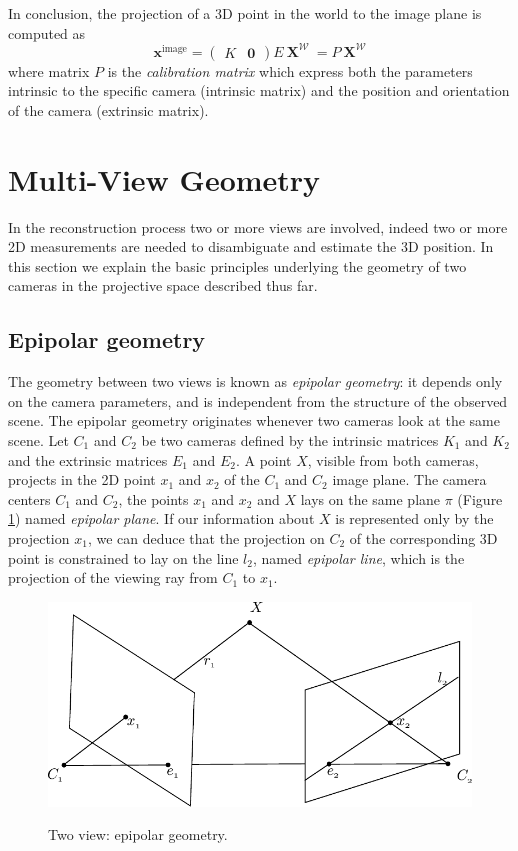 In conclusion, the projection of a 3D point in the world to the image plane is computed as
\begin{equation}
 \mathbf{x}^{\text{image}}
 = 
\begin{pmatrix}
 K &\mathbf{0}
 \end{pmatrix} 
E
\:
 \mathbf{X}^\mathcal{W}\:=
P
\:
 \mathbf{X}^\mathcal{W}
\end{equation}
where matrix $P$ is the \emph{calibration matrix} which express both the parameters intrinsic to the specific camera (intrinsic matrix) and the position and orientation of the camera (extrinsic matrix).


\section{Multi-View Geometry}
In the reconstruction process two or more views are involved, indeed two or more 2D measurements are needed to disambiguate and estimate the 3D position. 
In this section we explain the basic principles underlying the geometry of two cameras in the projective space described thus far.
\subsection{Epipolar geometry}
The geometry between two views is known as \emph{epipolar geometry}: it depends only on the camera parameters, and is independent from the structure of the observed scene.
The epipolar geometry originates whenever two cameras look at the same scene. 
Let $C_1$ and $C_2$ be two cameras defined by the intrinsic matrices $K_1$ and $K_2$ and the extrinsic matrices $E_1$ and $E_2$.
A point $X$,  visible from both cameras, projects in the 2D point $x_1$ and $x_2$ of the $C_1$ and   $C_2$ image plane.
The camera centers $C_1$ and $C_2$, the points $x_1$ and $x_2$ and $X$ lays on the same plane $\pi$ (Figure \ref{fig:epipolar}) named \emph{epipolar plane}. 
If our information about $X$ is represented only by the projection $x_1$, we can deduce that the projection on $C_2$ of the corresponding 3D point is constrained to lay on the line $l_2$, named \emph{epipolar line}, which is the projection of the viewing ray from $C_1$ to $x_1$.



\begin{figure}[t]
\centering
  \includegraphics[width=0.8\columnwidth]{./img/ch-camera/cameraEpipolar}\\
 \caption{Two view: epipolar geometry.}
 \label{fig:epipolar}
\end{figure}

